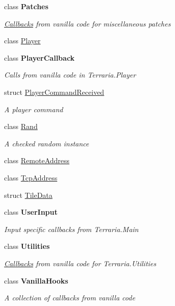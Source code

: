 \begin{DoxyCompactItemize}
class {\bfseries Patches}
\begin{DoxyCompactList}\small\item\em \hyperlink{namespace_o_t_a_1_1_callbacks}{Callbacks} from vanilla code for miscellaneous patches \end{DoxyCompactList}\item 
class \hyperlink{class_o_t_a_1_1_callbacks_1_1_player}{Player}
\item 
class {\bfseries Player\+Callback}
\begin{DoxyCompactList}\small\item\em Calls from vanilla code in Terraria.\+Player \end{DoxyCompactList}\item 
struct \hyperlink{struct_o_t_a_1_1_callbacks_1_1_player_command_received}{Player\+Command\+Received}
\begin{DoxyCompactList}\small\item\em A player command \end{DoxyCompactList}\item 
class \hyperlink{class_o_t_a_1_1_callbacks_1_1_rand}{Rand}
\begin{DoxyCompactList}\small\item\em A checked random instance \end{DoxyCompactList}\item 
class \hyperlink{class_o_t_a_1_1_callbacks_1_1_remote_address}{Remote\+Address}
\item 
class \hyperlink{class_o_t_a_1_1_callbacks_1_1_tcp_address}{Tcp\+Address}
\item 
struct \hyperlink{struct_o_t_a_1_1_callbacks_1_1_tile_data}{Tile\+Data}
\item 
class {\bfseries User\+Input}
\begin{DoxyCompactList}\small\item\em Input specific callbacks from Terraria.\+Main \end{DoxyCompactList}\item 
class {\bfseries Utilities}
\begin{DoxyCompactList}\small\item\em \hyperlink{namespace_o_t_a_1_1_callbacks}{Callbacks} from vanilla code for Terraria.\+Utilities \end{DoxyCompactList}\item 
class {\bfseries Vanilla\+Hooks}
\begin{DoxyCompactList}\small\item\em A collection of callbacks from vanilla code \end{DoxyCompactList}\end{DoxyCompactItemize}
